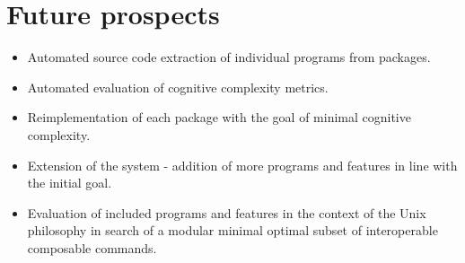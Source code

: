 \section{Future prospects}\label{Future prospects}

\begin{itemize}
    \item Automated source code extraction of individual programs from packages.
    \item Automated evaluation of cognitive complexity metrics.
    \item Reimplementation of each package with the goal of minimal cognitive complexity.
    \item Extension of the system - addition of more programs and features in line with the initial goal.
    \item Evaluation of included programs and features in the context of the Unix philosophy in search of a modular minimal optimal subset of interoperable composable commands.
\end{itemize}
